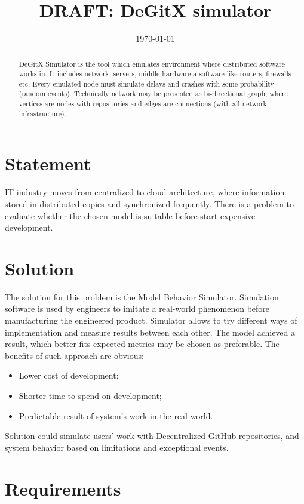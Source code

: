\documentclass[12pt,oneside]{article}
\date{\small\today}
\title{%
  DRAFT: DeGitX simulator \\
  \colorbox{firebrick}{\small\sffamily\color{white}{White Paper}}}
\begin{document}
\raggedbottom

\maketitle
\begin{abstract}
DeGitX Simulator is the tool which emulates environment where distributed software works in. It includes network, servers, middle hardware a software like routers, firewalls etc. Every emulated node must simulate delays and crashes with some probability (random events). Technically network may be presented as bi-directional graph, where vertices are nodes with repositories and edges are connections (with all network infrastructure). 
\end{abstract}


\section{Statement}
IT industry moves from centralized to cloud architecture, where information stored in distributed copies and synchronized frequently. There is a problem to evaluate whether the chosen model is suitable before start expensive development. 

\section{Solution}
The solution for this problem is the Model Behavior Simulator. Simulation software is used by engineers to imitate a real-world phenomenon before manufacturing the engineered product. Simulator allows to try different ways of implementation and measure results between each other. The model achieved a result, which better fits expected metrics may be chosen as preferable.
The benefits of such approach are obvious:
\begin{itemize}
    \item Lower cost of development;
    \item Shorter time to spend on development;
    \item Predictable result of system's work in the real world.
\end{itemize}
Solution could simulate users' work with Decentralized GitHub repositories, and system behavior based on limitations and exceptional events.

\section{Requirements}
\label{sec:requirements}
\end{document}
